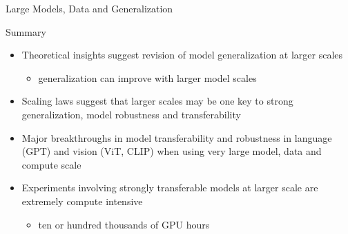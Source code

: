 
\begin{frame}{Large Models, Data and Generalization}
\protect\hypertarget{large-models-data-and-generalization-4}{}
\begin{block}{Summary}
\protect\hypertarget{summary}{}
\begin{itemize}
\tightlist
\item
  Theoretical insights suggest revision of model generalization at
  larger scales

  \begin{itemize}
  \tightlist
  \item
    generalization can improve with larger model scales\\
  \end{itemize}
\item
  Scaling laws suggest that larger scales may be one key to strong
  generalization, model robustness and transferability
\item
  Major breakthroughs in model transferability and robustness in
  language (GPT) and vision (ViT, CLIP) when using very large model,
  data and compute scale
\item
  Experiments involving strongly transferable models at larger scale are
  extremely compute intensive

  \begin{itemize}
  \tightlist
  \item
    ten or hundred thousands of GPU hours
  \end{itemize}
\end{itemize}
\end{block}
\end{frame}

